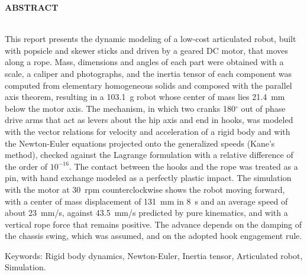 \begin{center}
\textbf{ABSTRACT}
\end{center}

$\!$\\

This report presents the dynamic modeling of a low-cost articulated robot, built with popsicle and skewer sticks and driven by a geared DC motor, that moves along a rope. Mass, dimensions and angles of each part were obtained with a scale, a caliper and photographs, and the inertia tensor of each component was computed from elementary homogeneous solids and composed with the parallel axis theorem, resulting in a 103.1~g robot whose center of mass lies 21.4~mm below the motor axis. The mechanism, in which two cranks 180$^\circ$ out of phase drive arms that act as levers about the hip axis and end in hooks, was modeled with the vector relations for velocity and acceleration of a rigid body and with the Newton-Euler equations projected onto the generalized speeds (Kane's method), checked against the Lagrange formulation with a relative difference of the order of $10^{-16}$. The contact between the hooks and the rope was treated as a pin, with hand exchange modeled as a perfectly plastic impact. The simulation with the motor at 30~rpm counterclockwise shows the robot moving forward, with a center of mass displacement of 131~mm in 8~s and an average speed of about 23~mm/s, against 43.5~mm/s predicted by pure kinematics, and with a vertical rope force that remains positive. The advance depends on the damping of the chassis swing, which was assumed, and on the adopted hook engagement rule.

\vspace{1cm}

\hspace{-1.3cm}Keywords: Rigid body dynamics, Newton-Euler, Inertia tensor, Articulated robot, Simulation.
